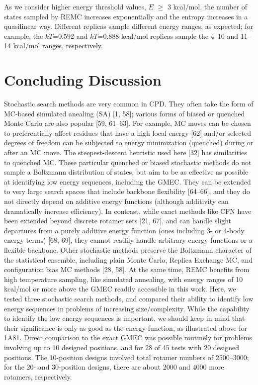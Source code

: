 As we consider higher energy threshold values, $E$ $\ge$ 3 kcal/mol, the number of states sampled by REMC increases exponentially and the entropy increases in a quasilinear way. Different replicas sample different energy ranges, as expected; for example, the $kT$=0.592 and $kT$=0.888 kcal/mol replicas sample the 4--10 and 11--14 kcal/mol ranges, respectively. 

\section{Concluding Discussion}
Stochastic search methods are very common in CPD. They often take the form of MC-based simulated anealing (SA) [1, 58]; various forms of biased or quenched Monte Carlo are also popular [59, 61–63]. For example, MC moves can be chosen to preferentially affect residues that have a high local energy [62] and/or selected degrees of freedom can be subjected to energy minimization (quenched) during or after an MC move. The steepest-descent heuristic used here [32] has similarities to quenched MC. These particular quenched or biased stochastic methods do not sample a Boltzmann distribution of states, but aim to be as effective as possible at identifying low energy sequences, including the GMEC. They can be extended to very large search spaces that include backbone flexibility [64–66], and they do not directly depend on additive energy functions (although additivity can dramatically increase efficiency). In contrast, while exact methods like CFN have been extended beyond discrete rotamer sets [21, 67], and can handle slight departures from a purely additive energy function (ones including 3- or 4-body energy terms) [68, 69], they cannot readily handle arbitrary energy functions or a flexible backbone. Other stochastic methods preserve the Boltzmann character of the statistical ensemble, including plain Monte Carlo, Replica Exchange MC, and configuration bias MC methods [28, 58]. At the same time, REMC benefits from high temperature sampling, like simulated annealing, with energy ranges of 10 kcal/mol or more above the GMEC readily accessible in this work.
Here, we tested three stochastic search methods, and compared their ability to identify low energy sequences in problems of increasing size/complexity. While the capability to identify the low energy sequences is important, we should keep in mind that their significance is only as good as the energy function, as illustrated above for 1A81. Direct comparison to the exact GMEC was possible routinely for problems involving up to 10 designed positions, and for 28 of 45 tests with 20 designed positions. The 10-position designs involved total rotamer numbers of 2500--3000; for the 20- and 30-position designs, there are about 2000 and 4000 more rotamers, respectively.
